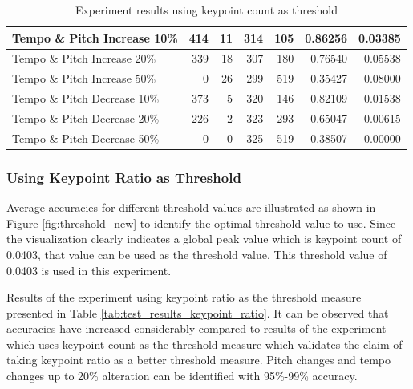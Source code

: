 \begin{table}[H]
\begin{tabular}{|L|r|r|r|r|r|r|}
        Tempo \& Pitch Increase 10\%       & 414         & 11          & 314         & 105         & 0.86256           & 0.03385          \\ \hline
        Tempo \& Pitch Increase 20\%       & 339         & 18          & 307         & 180         & 0.76540           & 0.05538          \\ \hline
        Tempo \& Pitch Increase 50\%       & 0           & 26          & 299         & 519         & 0.35427           & 0.08000          \\ \hline
        Tempo \& Pitch Decrease 10\%       & 373         & 5           & 320         & 146         & 0.82109           & 0.01538          \\ \hline
        Tempo \& Pitch Decrease 20\%       & 226         & 2           & 323         & 293         & 0.65047           & 0.00615          \\ \hline
        Tempo \& Pitch Decrease 50\%       & 0           & 0           & 325         & 519         & 0.38507           & 0.00000          \\ \hline
    \end{tabular}
    \vspace{12pt}
    \caption{Experiment results using keypoint count as threshold}
    \label{tab:test_results_keypoint}
\end{table}


\subsubsection{Using Keypoint Ratio as Threshold}

Average accuracies for different threshold values are illustrated as shown in Figure \ref{fig:threshold_new} to identify the optimal threshold value to use. Since
the visualization clearly indicates a global peak value which is keypoint count of 0.0403, that value can be used as the threshold value. This threshold value of 
0.0403 is used in this experiment. 
\vspace{12pt}

Results of the experiment using keypoint ratio as the threshold measure presented in Table \ref{tab:test_results_keypoint_ratio}. It can be observed that accuracies
have increased considerably compared to results of the experiment which uses keypoint count as the threshold measure which validates the claim of taking keypoint ratio as
a better threshold measure. Pitch changes and tempo changes up to 20\% alteration can be identified with 95\%-99\% accuracy.

